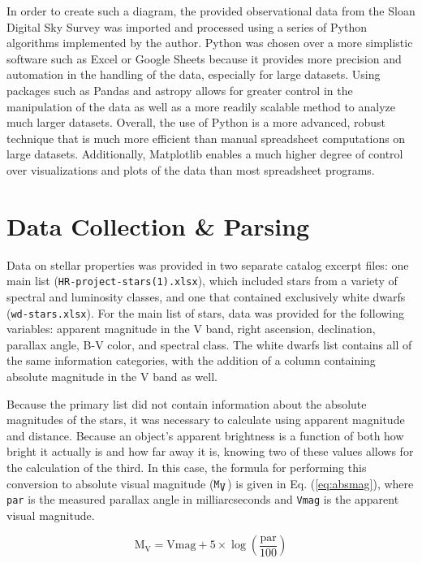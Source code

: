 \documentclass[twocolumn]{aastex63}
\begin{document}
In order to create such a diagram, the provided observational data from the Sloan Digital Sky Survey \citep{SDSS-IV} was imported and processed using a series of Python algorithms implemented by the author. Python was chosen over a more simplistic software such as Excel or Google Sheets because it provides more precision and automation in the handling of the data, especially for large datasets. Using packages such as Pandas \citep{pandas} and astropy \citep{astropy} allows for greater control in the manipulation of the data as well as a more readily scalable method to analyze much larger datasets. Overall, the use of Python is a more advanced, robust technique that is much more efficient than manual spreadsheet computations on large datasets. Additionally,  Matplotlib \citep{matplotlib} enables a much higher degree of control over visualizations and plots of the data than most spreadsheet programs.

\section{Data Collection \& Parsing} \label{sec:data}

Data on stellar properties was provided in two separate catalog excerpt files: one main list (\verb|HR-project-stars(1).xlsx|), which included stars from a variety of spectral and luminosity classes, and one that contained exclusively white dwarfs (\verb|wd-stars.xlsx|). For the main list of stars, data was provided for the following variables: apparent magnitude in the V band, right ascension, declination, parallax angle, B-V color, and spectral class. The white dwarfs list contains all of the same information categories, with the addition of a column containing absolute magnitude in the V band as well.

Because the primary list did not contain information about the absolute magnitudes of the stars, it was necessary to calculate using apparent magnitude and distance. Because an object's apparent brightness is a function of both how bright it actually is and how far away it is, knowing two of these values allows for the calculation of the third. In this case, the formula for performing this conversion to absolute visual magnitude (${\verb|M|}_{\verb|V|}$) is given in Eq. (\ref{eq:absmag}), where \verb|par| is the measured parallax angle in milliarcseconds and \verb|Vmag| is the apparent visual magnitude.

\begin{equation} \label{eq:absmag}
  \text{M}_{\text{V}} = \text{Vmag} + 5\times\log(\frac{\text{par}}{100})
\end{equation}
\end{document}
